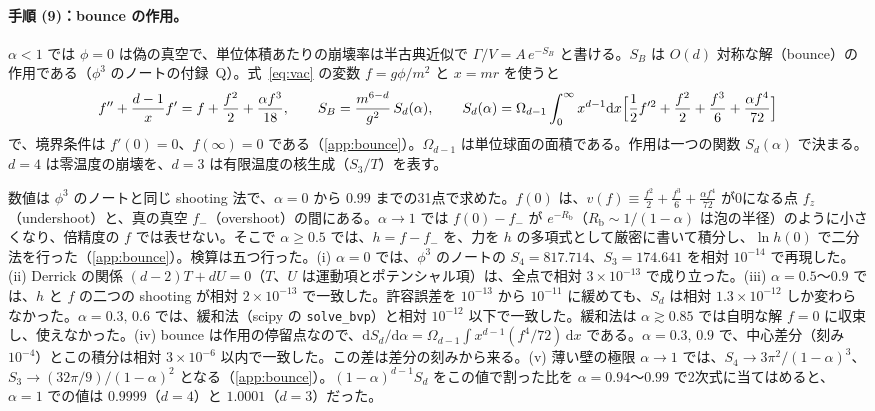 \documentclass[a4paper,10pt]{ltjsarticle}
\newcommand{\dd}{\mathrm{d}}
\begin{document}
\paragraph{手順 (9)：bounce の作用。}$\alpha<1$ では $\phi=0$ は偽の真空で、単位体積あたりの崩壊率は半古典近似で $\Gamma/V=A\,e^{-S_B}$ と書ける。$S_B$ は $O(d)$ 対称な解（bounce）の作用である（$\phi^3$ のノートの付録~Q）。式~\eqref{eq:vac} の変数 $f=g\phi/m^2$ と $x=mr$ を使うと
\begin{equation}
f''+\frac{d-1}{x}f'=f+\frac{f^2}{2}+\frac{\alpha f^3}{18},\qquad
S_B=\frac{m^{6-d}}{g^2}\,S_d(\alpha),\qquad
S_d(\alpha)=\Omega_{d-1}\int_0^\infty x^{d-1}\dd x\Bigl[\frac12f'^2+\frac{f^2}{2}+\frac{f^3}{6}+\frac{\alpha f^4}{72}\Bigr]
\label{eq:bounce}
\end{equation}
で、境界条件は $f'(0)=0$、$f(\infty)=0$ である（\ref{app:bounce}）。$\Omega_{d-1}$ は単位球面の面積である。作用は一つの関数 $S_d(\alpha)$ で決まる。$d=4$ は零温度の崩壊を、$d=3$ は有限温度の核生成（$S_3/T$）を表す。

数値は $\phi^3$ のノートと同じ shooting 法で、$\alpha=0$ から $0.99$ までの31点で求めた。$f(0)$ は、$v(f)\equiv\frac{f^2}2+\frac{f^3}6+\frac{\alpha f^4}{72}$ が0になる点 $f_z$（undershoot）と、真の真空 $f_-$（overshoot）の間にある。$\alpha\to1$ では $f(0)-f_-$ が $e^{-R_{\mathrm b}}$（$R_{\mathrm b}\sim1/(1-\alpha)$ は泡の半径）のように小さくなり、倍精度の $f$ では表せない。そこで $\alpha\ge0.5$ では、$h=f-f_-$ を、力を $h$ の多項式として厳密に書いて積分し、$\ln h(0)$ で二分法を行った（\ref{app:bounce}）。検算は五つ行った。(i) $\alpha=0$ では、$\phi^3$ のノートの $S_4=817.714$、$S_3=174.641$ を相対 $10^{-14}$ で再現した。(ii) Derrick の関係 $(d-2)T+dU=0$（$T$、$U$ は運動項とポテンシャル項）は、全点で相対 $3\times10^{-13}$ で成り立った。(iii) $\alpha=0.5$〜$0.9$ では、$h$ と $f$ の二つの shooting が相対 $2\times10^{-13}$ で一致した。許容誤差を $10^{-13}$ から $10^{-11}$ に緩めても、$S_d$ は相対 $1.3\times10^{-12}$ しか変わらなかった。$\alpha=0.3,\,0.6$ では、緩和法（scipy の \texttt{solve\_bvp}）と相対 $10^{-12}$ 以下で一致した。緩和法は $\alpha\gtrsim0.85$ では自明な解 $f=0$ に収束し、使えなかった。(iv) bounce は作用の停留点なので、$\dd S_d/\dd\alpha=\Omega_{d-1}\int x^{d-1}(f^4/72)\,\dd x$ である。$\alpha=0.3,\,0.9$ で、中心差分（刻み $10^{-4}$）とこの積分は相対 $3\times10^{-6}$ 以内で一致した。この差は差分の刻みから来る。(v) 薄い壁の極限 $\alpha\to1$ では、$S_4\to3\pi^2/(1-\alpha)^3$、$S_3\to(32\pi/9)/(1-\alpha)^2$ となる（\ref{app:bounce}）。$(1-\alpha)^{d-1}S_d$ をこの値で割った比を $\alpha=0.94$〜$0.99$ で2次式に当てはめると、$\alpha=1$ での値は $0.9999$（$d=4$）と $1.0001$（$d=3$）だった。
\end{document}
